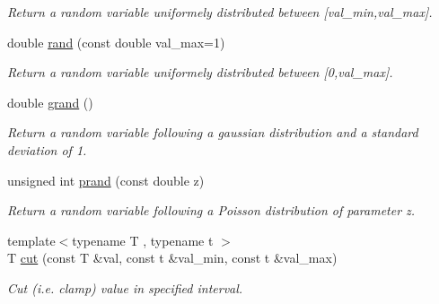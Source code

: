\begin{DoxyCompactItemize}
\begin{DoxyCompactList}\small\item\em Return a random variable uniformely distributed between \mbox{[}val\+\_\+min,val\+\_\+max\mbox{]}. \end{DoxyCompactList}\item 
\mbox{\label{namespacecimg__library__suffixed_1_1cimg_af5cd3397f819c13ccb17e05a7db736b1}} 
double \hyperlink{namespacecimg__library__suffixed_1_1cimg_af5cd3397f819c13ccb17e05a7db736b1}{rand} (const double val\+\_\+max=1)
\begin{DoxyCompactList}\small\item\em Return a random variable uniformely distributed between \mbox{[}0,val\+\_\+max\mbox{]}. \end{DoxyCompactList}\item 
\mbox{\label{namespacecimg__library__suffixed_1_1cimg_aa12c572ad67f655e27f7b8e3e76dafa5}} 
double \hyperlink{namespacecimg__library__suffixed_1_1cimg_aa12c572ad67f655e27f7b8e3e76dafa5}{grand} ()
\begin{DoxyCompactList}\small\item\em Return a random variable following a gaussian distribution and a standard deviation of 1. \end{DoxyCompactList}\item 
\mbox{\label{namespacecimg__library__suffixed_1_1cimg_a2a18bbfb6a496d8d5a02943be8eaa936}} 
unsigned int \hyperlink{namespacecimg__library__suffixed_1_1cimg_a2a18bbfb6a496d8d5a02943be8eaa936}{prand} (const double z)
\begin{DoxyCompactList}\small\item\em Return a random variable following a Poisson distribution of parameter z. \end{DoxyCompactList}\item 
\mbox{\label{namespacecimg__library__suffixed_1_1cimg_a60c895ccdb84e7ccdd884ff61bab29f0}} 
{\footnotesize template$<$typename T , typename t $>$ }\\T \hyperlink{namespacecimg__library__suffixed_1_1cimg_a60c895ccdb84e7ccdd884ff61bab29f0}{cut} (const T \&val, const t \&val\+\_\+min, const t \&val\+\_\+max)
\begin{DoxyCompactList}\small\item\em Cut (i.\+e. clamp) value in specified interval. \end{DoxyCompactList}\item 

\end{DoxyCompactItemize}
